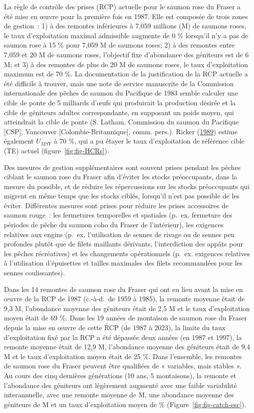 \documentclass[french,11pt]{book}
\begin{document}
La règle de contrôle des prises (RCP) actuelle pour le saumon rose du Fraser a été mise en œuvre pour la première fois en 1987. Elle est composée de trois zones de gestion~: 1) à des remontes inférieures à 7,059 millions (M) de saumons roses, le taux d'exploitation maximal admissible augmente de 0 \% lorsqu'il n'y a pas de saumon rose à 15 \% pour 7,059 M de saumons roses; 2) à des remontes entre 7,059 et 20 M de saumons roses, l'objectif fixe d'abondance des géniteurs est de 6 M; et 3) à des remontes de plus de 20 M de saumons roses, le taux d'exploitation maximum est de 70 \%. La documentation de la justification de la RCP actuelle a été difficile à trouver, mais une note de service manuscrite de la Commission internationale des pêches de saumon du Pacifique de 1983 semble calculer une cible de ponte de 5 milliards d'œufs qui produirait la production désirée et la cible de géniteurs adultes correspondante, en supposant un poids moyen, qui atteindrait la cible de ponte (S. Latham, Commission du saumon du Pacifique {[}CSP{]}, Vancouver {[}Colombie-Britannique{]}, comm. pers.). Ricker (\protect\hyperlink{ref-rickerHistoryPresentState1989}{1989}) estime également \(U_{MSY}\) à 70 \%, qui a pu étayer le taux d'exploitation de référence cible (TE) actuel (figure~\ref{fig:fig-HCRs}).

Des mesures de gestion supplémentaires sont souvent prises pendant les pêches ciblant le saumon rose du Fraser afin d'éviter les stocks préoccupants, dans la mesure du possible, et de réduire les répercussions sur les stocks préoccupants qui migrent en même temps que les stocks ciblés, lorsqu'il n'est pas possible de les éviter. Différentes mesures sont prises pour réduire les prises accessoires de saumon rouge~: les fermetures temporelles et spatiales (p.~ex. fermeture des périodes de pêche du saumon coho du Fraser de l'intérieur), les exigences relatives aux engins (p.~ex. l'utilisation de sennes de rivage ou de sennes peu profondes plutôt que de filets maillants dérivants, l'interdiction des appâts pour les pêches récréatives) et les changements opérationnels (p.~ex. exigences relatives à l'utilisation d'épuisettes et tailles maximales des filets recommandées pour les sennes coulissantes).

Dans les 14 remontes de saumon rose du Fraser qui ont eu lieu avant la mise en œuvre de la RCP de 1987 (c.-à-d.~de 1959 à 1985), la remonte moyenne était de 9,3 M, l'abondance moyenne des géniteurs était de 2,5 M et le taux d'exploitation moyen était de 69 \%. Dans les 19 années de montaison de saumon rose du Fraser depuis la mise en œuvre de cette RCP (de 1987 à 2023), la limite du taux d'exploitation fixé par la RCP a été dépassée deux années (en 1987 et 1997), la remonte moyenne était de 12,9 M, l'abondance moyenne des géniteurs était de 9,4 M et le taux d'exploitation moyen était de 25 \%. Dans l'ensemble, les remontes de saumon rose du Fraser peuvent être qualifiées de « variables, mais stables ». Au cours des cinq dernières générations (10 ans, 5 montaisons), la remonte et l'abondance des géniteurs ont légèrement augmenté avec une faible variabilité interannuelle, avec une remonte moyenne de  M, une abondance moyenne des géniteurs de  M et un taux d'exploitation moyen de  \% (Figure~\ref{fig:fig-catch-esc}).
\end{document}
